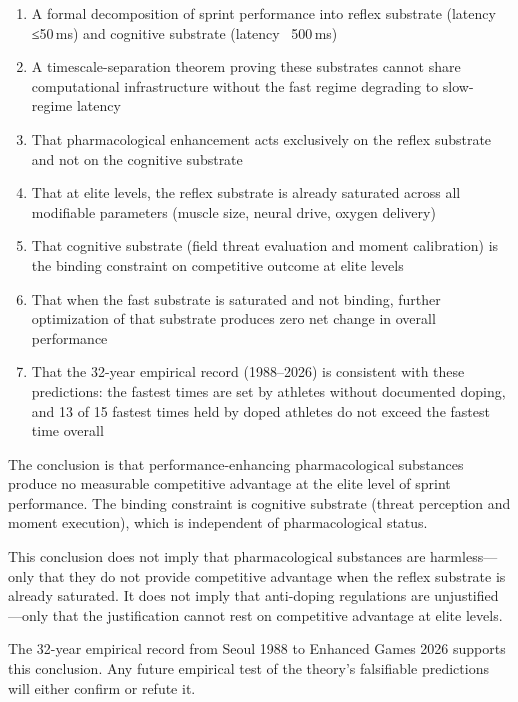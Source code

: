 \documentclass[11pt,twocolumn]{article}
\theoremstyle{definition}
\theoremstyle{remark}
\begin{document}
\begin{enumerate}[leftmargin=1.2em]
\item A formal decomposition of sprint performance into reflex substrate (latency ≤50\,ms) and cognitive substrate (latency ~500\,ms)

\item A timescale-separation theorem proving these substrates cannot share computational infrastructure without the fast regime degrading to slow-regime latency

\item That pharmacological enhancement acts exclusively on the reflex substrate and not on the cognitive substrate

\item That at elite levels, the reflex substrate is already saturated across all modifiable parameters (muscle size, neural drive, oxygen delivery)

\item That cognitive substrate (field threat evaluation and moment calibration) is the binding constraint on competitive outcome at elite levels

\item That when the fast substrate is saturated and not binding, further optimization of that substrate produces zero net change in overall performance

\item That the 32-year empirical record (1988--2026) is consistent with these predictions: the fastest times are set by athletes without documented doping, and 13 of 15 fastest times held by doped athletes do not exceed the fastest time overall
\end{enumerate}

The conclusion is that performance-enhancing pharmacological substances produce no measurable competitive advantage at the elite level of sprint performance. The binding constraint is cognitive substrate (threat perception and moment execution), which is independent of pharmacological status.

This conclusion does not imply that pharmacological substances are harmless—only that they do not provide competitive advantage when the reflex substrate is already saturated. It does not imply that anti-doping regulations are unjustified—only that the justification cannot rest on competitive advantage at elite levels.

The 32-year empirical record from Seoul 1988 to Enhanced Games 2026 supports this conclusion. Any future empirical test of the theory's falsifiable predictions will either confirm or refute it.
\end{document}
